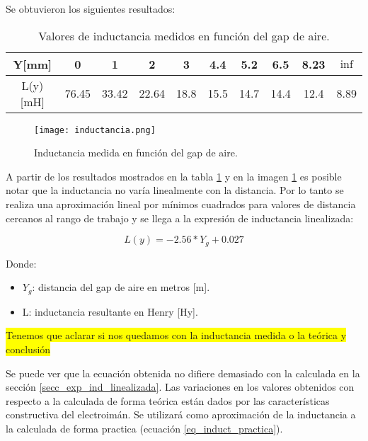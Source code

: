\noindent Se obtuvieron los siguientes resultados:

\begin{table} [H]
	\begin{center}
		\begin{tabular}{| c | c | c | c | c | c | c | c | c | c |}
			\hline			
			Y[mm] & 0 & 1 & 2 & 3 & 4.4 & 5.2 & 6.5 & 8.23 & $\inf$ \\ \hline
			L(y)[mH] & 76.45 & 33.42 & 22.64 & 18.8 & 15.5 & 14.7 & 14.4 & 12.4 & 8.89\\ \hline
		\end{tabular}
		\caption{Valores de inductancia medidos en función del gap de aire.}
		\label{tab_mediciones_inductancia}
	\end{center}
\end{table}

\begin{figure} [H]
	\centering
	\texttt{[image: inductancia.png]}
	\caption{Inductancia medida en función del gap de aire.}
	\label{fig:img_inductancia_medida}
\end{figure}
\noindent A partir de los resultados mostrados en la tabla \ref{tab_mediciones_inductancia} y en la imagen \ref{fig:img_inductancia_medida} es posible notar que la inductancia no varía linealmente con la distancia. Por lo tanto se realiza una aproximación lineal por mínimos cuadrados para valores de distancia cercanos al rango de trabajo y se llega a la expresión de inductancia linealizada:

\begin{equation}
	\label{eq_induct_practica}
	L(y)=-2.56*Y_{g}+0.027
\end{equation}

\noindent Donde:
\begin{itemize}
	\item $Y_{g}$: distancia del gap de aire en metros [m].
	\item L: inductancia resultante en Henry [Hy].
\end{itemize}
\colorbox{yellow}{Tenemos que aclarar si nos quedamos con la inductancia medida o la teórica y conclusión}

\noindent Se puede ver que la ecuación obtenida no  difiere demasiado con la calculada en la sección \ref{secc_exp_ind_linealizada}. Las variaciones en los valores obtenidos con respecto a la calculada de forma teórica están dados por las características constructiva del electroimán. Se utilizará como aproximación de la inductancia a la calculada de forma practica (ecuación \ref{eq_induct_practica}).

